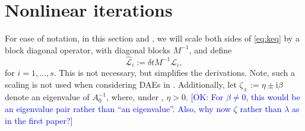 \documentclass[review]{siamart}
\makeatletter
\newcommand{\todo}[1]{\textcolor{red}{[TODO\@: #1]}}
\newcommand{\OK}[1]{\textcolor{blue}{[OK: #1]}}
\makeatother
\begin{document}
\section{Nonlinear iterations}\label{sec:nonlinear}

For ease of notation, in this section and , we will scale
both sides of \eqref{eq:keq} by a block diagonal operator, with diagonal
blocks $M^{-1}$, and define
%
\begin{equation*}
\widehat{\mathcal{L}}_i := \delta t M^{-1}\mathcal{L}_i,
\end{equation*}
%
for $i=1,...,s$. This is not necessary, but simplifies the derivations. Note,
such a scaling is not used when considering DAEs in .
Additionally, let $\zeta_{\pm} := \eta \pm \mathrm{i}\beta$ denote an
eigenvalue of $A_0^{-1}$, where, under , $\eta > 0$.
%
\OK{For $\beta \neq 0$, this would be an eigenvalue pair rather than ``an eigenvalue''. Also, why now $\zeta$ rather than $\lambda$ as in the first paper?}
%


\end{document}
